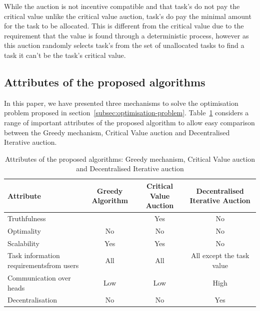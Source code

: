 While the auction is not incentive compatible and that task's do not pay the critical value unlike the critical value
auction, task's do pay the minimal amount for the task to be allocated. This is different from the critical value due
to the requirement that the value is found through a deterministic process, however as this auction randomly selects
task's from the set of unallocated tasks to find a task it can't be the task's critical value.

\subsection{Attributes of the proposed algorithms}
\label{subsec:attributes-of-proposed-algorithms}
In this paper, we have presented three mechanisms to solve the optimisation problem proposed in
section~\ref{subsec:optimisation-problem}. Table~\ref{tab:attributes_algorithms} considers a range of
important attributes of the proposed algorithm to allow easy comparison between the Greedy mechanism,
Critical Value auction and Decentralised Iterative auction.

\begin{table}[H]
    \begin{tabular}{|l|c|c|c|}
        \hline
        \textbf{Attribute} & Greedy Algorithm & Critical Value Auction & Decentralised Iterative Auction \\ \hline
        Truthfulness & & Yes & No \\ \hline
        Optimality & No  & No & No \\ \hline
        Scalability & Yes & Yes & No \\ \hline
        Task information requirements\newline from users & All & All & All except the task value \\ \hline
        Communication over heads & Low & Low & High \\ \hline
        Decentralisation & No  & No  & Yes \\ \hline
    \end{tabular}
    \caption{Attributes of the proposed algorithms: Greedy mechanism, Critical Value auction and
    Decentralised Iterative auction}
    \label{tab:attributes_algorithms}
\end{table}
